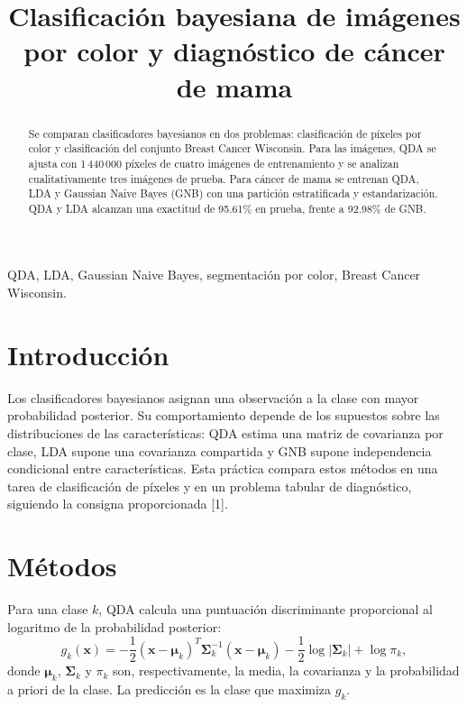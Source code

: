 \documentclass[conference]{IEEEtran}
\title{Clasificación bayesiana de imágenes por color y diagnóstico de cáncer de mama}
\author{\IEEEauthorblockN{Nombre del estudiante}
\IEEEauthorblockA{Reconocimiento de Patrones}}
\begin{document}
\maketitle
\raggedbottom

\begin{abstract}
Se comparan clasificadores bayesianos en dos problemas: clasificación de píxeles por color y clasificación del conjunto Breast Cancer Wisconsin. Para las imágenes, QDA se ajusta con 1\,440\,000 píxeles de cuatro imágenes de entrenamiento y se analizan cualitativamente tres imágenes de prueba. Para cáncer de mama se entrenan QDA, LDA y Gaussian Naive Bayes (GNB) con una partición estratificada y estandarización. QDA y LDA alcanzan una exactitud de 95.61\% en prueba, frente a 92.98\% de GNB.
\end{abstract}

\begin{IEEEkeywords}
QDA, LDA, Gaussian Naive Bayes, segmentación por color, Breast Cancer Wisconsin.
\end{IEEEkeywords}

\section{Introducción}
Los clasificadores bayesianos asignan una observación a la clase con mayor probabilidad posterior. Su comportamiento depende de los supuestos sobre las distribuciones de las características: QDA estima una matriz de covarianza por clase, LDA supone una covarianza compartida y GNB supone independencia condicional entre características. Esta práctica compara estos métodos en una tarea de clasificación de píxeles y en un problema tabular de diagnóstico, siguiendo la consigna proporcionada [1].

\section{Métodos}
Para una clase $k$, QDA calcula una puntuación discriminante proporcional al logaritmo de la probabilidad posterior:
\begin{equation}
g_k(\mathbf{x})=-\frac{1}{2}(\mathbf{x}-\boldsymbol{\mu}_k)^T\boldsymbol{\Sigma}_k^{-1}(\mathbf{x}-\boldsymbol{\mu}_k)-\frac{1}{2}\log|\boldsymbol{\Sigma}_k|+\log\pi_k,
\end{equation}
donde $\boldsymbol{\mu}_k$, $\boldsymbol{\Sigma}_k$ y $\pi_k$ son, respectivamente, la media, la covarianza y la probabilidad a priori de la clase. La predicción es la clase que maximiza $g_k$.
\end{document}
